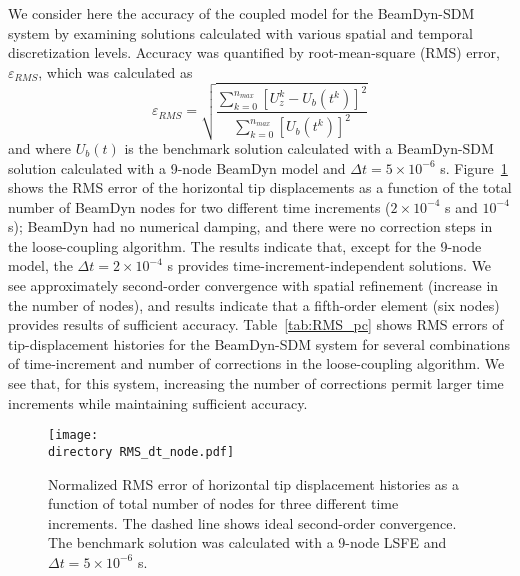 \documentclass{aiaa-tc}
\def\directory{EPSF/}
\begin{document}
We consider here the accuracy of the coupled model for the BeamDyn-SDM system by examining solutions calculated with various spatial and temporal discretization levels.
Accuracy was quantified by root-mean-square (RMS) error, $\varepsilon_{RMS}$,  which was calculated as
\begin{equation}
\varepsilon_{RMS}=\sqrt{\frac{\sum_{k=0}^{n_{max}}[U_z^k-U_b(t^k)]^2}{\sum_{k=0}^{n_{max}}[U_b(t^k)]^2}}
\label{RMSdefi}
\end{equation} 
and where $U_b(t)$ is the benchmark solution calculated with a BeamDyn-SDM solution calculated with a 9-node BeamDyn model and $\Delta t = 5 \times 10^{-6}$ s. Figure~\ref{fig:ConvDTNode} shows the RMS error of the horizontal tip displacements as a function of the total number of BeamDyn nodes for two different time increments ($2 \times 10^{-4}$ s and $10^{-4}$ s); BeamDyn had no numerical damping, and there were no correction steps in the loose-coupling algorithm.  The results indicate that, except for the 9-node model, the $\Delta t = 2 \times 10^{-4}$ s provides time-increment-independent solutions.
We see approximately second-order convergence with spatial refinement (increase in the number of nodes), and results indicate that a fifth-order element (six nodes) provides results of sufficient accuracy.
Table~\ref{tab:RMS_pc} shows RMS errors of tip-displacement histories for the BeamDyn-SDM system for several combinations of time-increment and number of corrections in the loose-coupling algorithm. We see that, for this system, increasing the number of corrections permit larger time increments while maintaining sufficient accuracy.  

\begin{figure}[h!tp]
\centering
\texttt{[image: \\directory RMS\_dt\_node.pdf]}
\caption{Normalized RMS error of horizontal tip displacement  histories as a function of total number of nodes for three different time increments. The dashed line shows ideal second-order convergence. The benchmark solution was calculated with a 9-node LSFE and $\Delta t = 5 \times 10^{-6}$ s.} 
\label{fig:ConvDTNode}
\end{figure}
\end{document}
